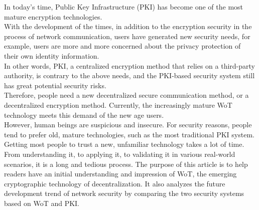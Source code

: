 In today's time, Public Key Infrastructure (PKI) has become one of the most mature 
encryption technologies\cite{b5}.
\\
With the development of the times, in addition to the encryption security in the 
process of network communication, users have generated new security needs, for example, 
users are more and more concerned about the privacy protection of their own identity information.
\\
In other words, PKI, a centralized encryption method that relies on a third-party 
authority, is contrary to the above needs, and the PKI-based security system still has 
great potential security risks\cite{b6}.
\\
Therefore, people need a new decentralized secure communication method, or a decentralized 
encryption method. Currently, the increasingly mature WoT technology meets this demand of 
the new age users\cite{b14}.
\\
However, human beings are suspicious and insecure. For security reasons, people tend 
to prefer old, mature technologies, such as the most traditional PKI system. Getting 
most people to trust a new, unfamiliar technology takes a lot of time. From understanding 
it, to applying it, to validating it in various real-world scenarios, it is a long and 
tedious process. The purpose of this article is to help readers have an initial 
understanding and impression of WoT, the emerging cryptographic technology of decentralization. 
It also analyzes the future development trend of network security by comparing the two 
security systems based on WoT and PKI.